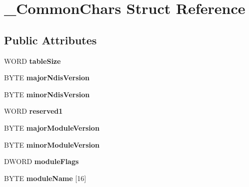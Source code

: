 \hypertarget{struct___common_chars}{
\section{\_\-CommonChars Struct Reference}
\label{struct___common_chars}
}
\subsection*{Public Attributes}
\begin{DoxyCompactItemize}
\item 
\hypertarget{struct___common_chars_aad3082c6e6876b07f5736671d116e896}{
WORD {\bfseries tableSize}}
\label{struct___common_chars_aad3082c6e6876b07f5736671d116e896}

\item 
\hypertarget{struct___common_chars_a7b10496931be57bcce0c42fd64c745e4}{
BYTE {\bfseries majorNdisVersion}}
\label{struct___common_chars_a7b10496931be57bcce0c42fd64c745e4}

\item 
\hypertarget{struct___common_chars_afe4719240e4b117cea8dd192a1c75410}{
BYTE {\bfseries minorNdisVersion}}
\label{struct___common_chars_afe4719240e4b117cea8dd192a1c75410}

\item 
\hypertarget{struct___common_chars_a678468399b9cead2a2997768d0d80c24}{
WORD {\bfseries reserved1}}
\label{struct___common_chars_a678468399b9cead2a2997768d0d80c24}

\item 
\hypertarget{struct___common_chars_a2ecc40f7517897e00b7eb0739297388a}{
BYTE {\bfseries majorModuleVersion}}
\label{struct___common_chars_a2ecc40f7517897e00b7eb0739297388a}

\item 
\hypertarget{struct___common_chars_a1c6df450ffa9248661abadcd1a9310a5}{
BYTE {\bfseries minorModuleVersion}}
\label{struct___common_chars_a1c6df450ffa9248661abadcd1a9310a5}

\item 
\hypertarget{struct___common_chars_a252e573b4bacad1e948d516a434eeefe}{
DWORD {\bfseries moduleFlags}}
\label{struct___common_chars_a252e573b4bacad1e948d516a434eeefe}

\item 
\hypertarget{struct___common_chars_a06789f9dd1d1345161104cccffaea74a}{
BYTE {\bfseries moduleName} \mbox{[}16\mbox{]}}
\label{struct___common_chars_a06789f9dd1d1345161104cccffaea74a}


\end{DoxyCompactItemize}
